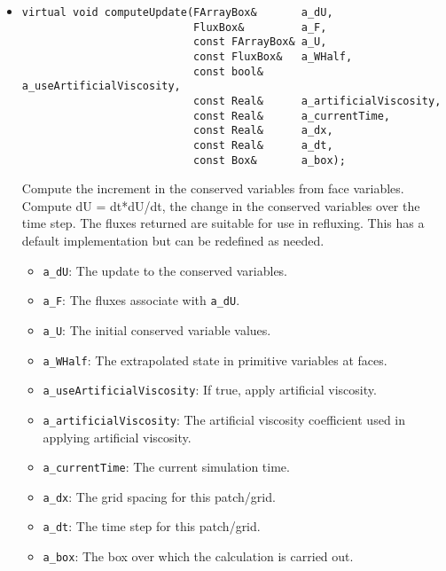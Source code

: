 \begin{itemize}
\item \begin{small}\begin{verbatim}
virtual void computeUpdate(FArrayBox&       a_dU,
                           FluxBox&         a_F,
                           const FArrayBox& a_U,
                           const FluxBox&   a_WHalf,
                           const bool&      a_useArtificialViscosity,
                           const Real&      a_artificialViscosity,
                           const Real&      a_currentTime,
                           const Real&      a_dx,
                           const Real&      a_dt,
                           const Box&       a_box);
\end{verbatim}\end{small}
Compute the increment in the conserved variables from face variables.
Compute dU = dt*dU/dt, the change in the conserved variables over
the time step. The fluxes returned are suitable for use in refluxing.
This has a default implementation but can be redefined as needed.
\begin{itemize}
\item \verb/a_dU/:  The update to the conserved variables.
\vspace{-0.07in}
\item \verb/a_F/:  The fluxes associate with \verb/a_dU/.
\vspace{-0.07in}
\item \verb/a_U/:  The initial conserved variable values.
\vspace{-0.07in}
\item \verb/a_WHalf/:  The extrapolated state in primitive variables at faces.
\vspace{-0.07in}
\item \verb/a_useArtificialViscosity/:  If true, apply artificial viscosity.
\vspace{-0.07in}
\item \verb/a_artificialViscosity/:  The artificial viscosity coefficient used
in applying artificial viscosity.
\vspace{-0.07in}
\item \verb/a_currentTime/: The current simulation time.
\vspace{-0.07in}
\item \verb/a_dx/: The grid spacing for this patch/grid.
\vspace{-0.07in}
\item \verb/a_dt/:  The time step for this patch/grid.
\vspace{-0.07in}
\item \verb/a_box/:  The box over which the calculation is carried out.
\end{itemize}


\end{itemize}

